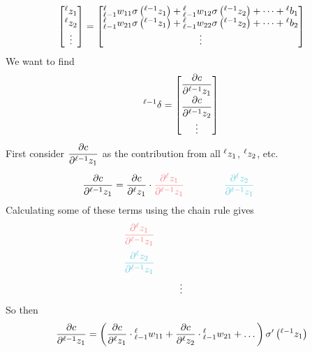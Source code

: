 \documentclass[11pt]{report} %
\begin{document}
\begin{equation}
\begin{bmatrix}\mathstrut^{\ell}z_{1}\\
\mathstrut^{\ell}z_{2}\\
\vdots
\end{bmatrix}=\begin{bmatrix}\mathstrut_{\ell-1}^{\ell}w_{11}\sigma\left(\mathstrut^{\ell-1}z_{1}\right)+\mathstrut_{\ell-1}^{\ell}w_{12}\sigma\left(\mathstrut^{\ell-1}z_{2}\right)+\dots+\mathstrut^{\ell}b_{1}\\
\mathstrut_{\ell-1}^{\ell}w_{21}\sigma\left(\mathstrut^{\ell-1}z_{1}\right)+\mathstrut_{\ell-1}^{\ell}w_{22}\sigma\left(\mathstrut^{\ell-1}z_{2}\right)+\dots+\mathstrut^{\ell}b_{2}\\
\vdots
\end{bmatrix}
\end{equation}
We want to find
\begin{equation}
\mathstrut^{\ell-1}\delta=\begin{bmatrix}\dfrac{\partial c}{\partial\mathstrut^{\ell-1}z_{1}}\\
\dfrac{\partial c}{\partial\mathstrut^{\ell-1}z_{2}}\\
\vdots
\end{bmatrix}
\end{equation}
First consider $\dfrac{\partial c}{\partial\mathstrut^{\ell-1}z_{1}}$ as the contribution from all $\mathstrut^{\ell}z_{1}$, $\mathstrut^{\ell}z_{2}$, etc.
\begin{equation}
\dfrac{\partial c}{\partial\mathstrut^{\ell-1}z_{1}}=\dfrac{\partial c}{\partial\mathstrut^{\ell}z_{1}}\cdot \red \dfrac{\partial\mathstrut^{\ell}z_{1}}{\partial\mathstrut^{\ell-1}z_{1}}\black +\dfrac{\partial c}{\partial\mathstrut^{\ell}z_{2}}\cdot \blue \dfrac{\partial\mathstrut^{\ell}z_{2}}{\partial\mathstrut^{\ell-1}z_{1}}\black+\dots
\end{equation}
Calculating some of these terms using the chain rule gives
\begin{gather}
\red\dfrac{\partial\mathstrut^{\ell}z_{1}}{\partial\mathstrut^{\ell-1}z_{1}}\black=\mathstrut_{\ell-1}^{\ell}w_{11}\sigma'\left(\mathstrut^{\ell-1}z_{1}\right) \\
\blue\dfrac{\partial\mathstrut^{\ell}z_{2}}{\partial\mathstrut^{\ell-1}z_{1}}\black=\mathstrut_{\ell-1}^{\ell}w_{21}\sigma'\left(\mathstrut^{\ell-1}z_{1}\right) \\
\vdots
\end{gather}
So then
\begin{equation}
\dfrac{\partial c}{\partial\mathstrut^{\ell-1}z_{1}}=\left(\dfrac{\partial c}{\partial\mathstrut^{\ell}z_{1}}\cdot\mathstrut_{\ell-1}^{\ell}w_{11}+\dfrac{\partial c}{\partial\mathstrut^{\ell}z_{2}}\cdot\mathstrut_{\ell-1}^{\ell}w_{21}+\dots\right)\sigma'\left(\mathstrut^{\ell-1}z_{1}\right)
\end{equation}
\end{document}
